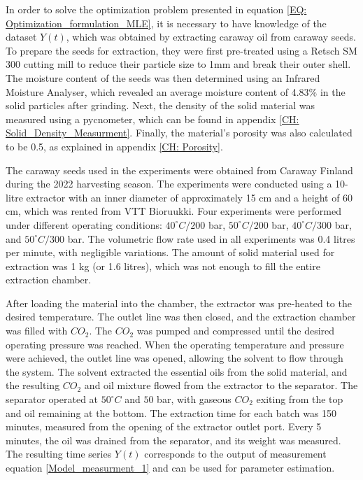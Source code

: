 \documentclass[../Article_Model_Parameters.tex]{subfiles}
\begin{document}
	
	\label{CH: Experiments}
	
	In order to solve the optimization problem presented in equation \ref{EQ: Optimization_formulation_MLE}, it is necessary to have knowledge of the dataset $Y(t)$, which was obtained by extracting caraway oil from caraway seeds. To prepare the seeds for extraction, they were first pre-treated using a Retsch SM 300 cutting mill to reduce their particle size to 1mm and break their outer shell. The moisture content of the seeds was then determined using an Infrared Moisture Analyser, which revealed an average moisture content of 4.83\% in the solid particles after grinding. Next, the density of the solid material was measured using a pycnometer, which can be found in appendix \ref{CH: Solid_Density_Measurment}. Finally, the material's porosity was also calculated to be 0.5, as explained in appendix \ref{CH: Porosity}.
	
	The caraway seeds used in the experiments were obtained from Caraway Finland during the 2022 harvesting season. The experiments were conducted using a 10-litre extractor with an inner diameter of approximately 15 cm and a height of 60 cm, which was rented from VTT Bioruukki. Four experiments were performed under different operating conditions: $40^\circ C / 200$ bar, $50^\circ C / 200$ bar, $40^\circ C / 300$ bar, and $50^\circ C / 300$ bar. The volumetric flow rate used in all experiments was 0.4 litres per minute, with negligible variations. The amount of solid material used for extraction was 1 kg (or 1.6 litres), which was not enough to fill the entire extraction chamber.
	
	After loading the material into the chamber, the extractor was pre-heated to the desired temperature. The outlet line was then closed, and the extraction chamber was filled with $CO_2$. The $CO_2$ was pumped and compressed until the desired operating pressure was reached. When the operating temperature and pressure were achieved, the outlet line was opened, allowing the solvent to flow through the system. The solvent extracted the essential oils from the solid material, and the resulting $CO_2$ and oil mixture flowed from the extractor to the separator. The separator operated at $50^\circ C$ and $50$ bar, with gaseous $CO_2$ exiting from the top and oil remaining at the bottom. The extraction time for each batch was 150 minutes, measured from the opening of the extractor outlet port. Every 5 minutes, the oil was drained from the separator, and its weight was measured. The resulting time series $Y(t)$ corresponds to the output of measurement equation \ref{Model_measurment_1} and can be used for parameter estimation.
	
\end{document}
